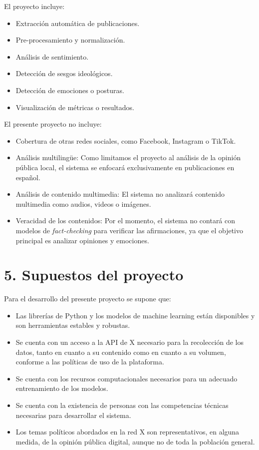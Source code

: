 \documentclass[
11pt, %
]{charter}
\begin{document}
El proyecto incluye:

\begin{itemize}
	\item Extracción automática de publicaciones.
	\item Pre-procesamiento y normalización.
	\item Análisis de sentimiento.
	\item Detección de sesgos ideológicos.
	\item Detección de emociones o posturas.
	\item Visualización de métricas o resultados.
\end{itemize}

El presente proyecto no incluye:

\begin{itemize}
	\item Cobertura de otras redes sociales, como Facebook, Instagram o TikTok.
	\item Análisis multilingüe: Como limitamos el proyecto al análisis de la opinión pública local, el sistema se enfocará exclusivamente en publicaciones en español.
	\item Análisis de contenido multimedia: El sistema no analizará contenido multimedia como audios, videos o imágenes.
	\item Veracidad de los contenidos: Por el momento, el sistema no contará con modelos de \textit{fact-checking} para verificar las afirmaciones, ya que el objetivo principal es analizar opiniones y emociones.
\end{itemize}

\section{5. Supuestos del proyecto}
\label{sec:supuestos}

Para el desarrollo del presente proyecto se supone que:

\begin{itemize}
	\item Las librerías de Python y los modelos de machine learning están disponibles y son herramientas estables y robustas.
	\item Se cuenta con un acceso a la API de X necesario para la recolección de los datos, tanto en cuanto a su contenido como en cuanto a su volumen, conforme a las políticas de uso de la plataforma.
	\item Se cuenta con los recursos computacionales necesarios para un adecuado entrenamiento de los modelos.
	\item Se cuenta con la existencia de personas con las competencias técnicas necesarias para desarrollar el sistema.
	\item Los temas políticos abordados en la red X son representativos, en alguna medida, de la opinión pública digital, aunque no de toda la población general.
\end{itemize}
\end{document}
